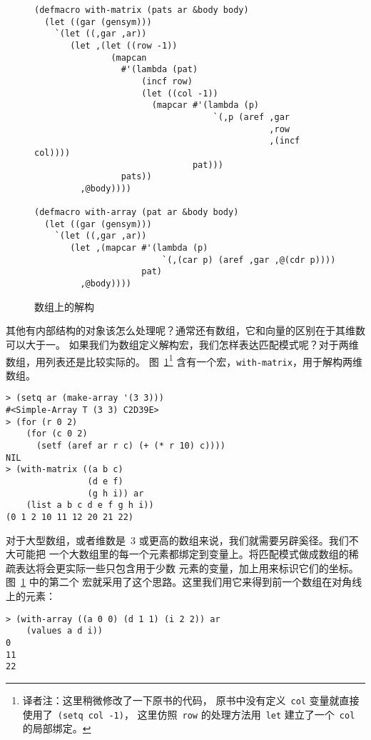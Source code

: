 \begin{figure}
\begin{lstlisting}
(defmacro with-matrix (pats ar &body body)
  (let ((gar (gensym)))
    `(let ((,gar ,ar))
       (let ,(let ((row -1))
               (mapcan
                 #'(lambda (pat)
                     (incf row)
                     (let ((col -1))
                       (mapcar #'(lambda (p)
                                   `(,p (aref ,gar
                                              ,row
                                              ,(incf col))))
                               pat)))
                 pats))
         ,@body))))

(defmacro with-array (pat ar &body body)
  (let ((gar (gensym)))
    `(let ((,gar ,ar))
       (let ,(mapcar #'(lambda (p)
                         `(,(car p) (aref ,gar ,@(cdr p))))
                     pat)
         ,@body))))
\end{lstlisting}
  \caption{数组上的解构}
  \label{fig:destructuring_on_arrays}
\end{figure}

其他有内部结构的对象该怎么处理呢？通常还有数组，它和向量的区别在于其维数可以大于一。
如果我们为数组定义解构宏，我们怎样表达匹配模式呢？对于两维数组，用列表还是比较实际的。
图~\ref{fig:destructuring_on_arrays}\footnote{译者注：这里稍微修改了一下原书的代码，
  原书中没有定义~\texttt{col} 变量就直接使用了~\texttt{(setq col -1)}，
  这里仿照~\texttt{row} 的处理方法用~\texttt{let} 建立了一个~\texttt{col}
  的局部绑定。} 含有一个宏，\texttt{with-matrix}，用于解构两维数组。
\begin{lstlisting}
> (setq ar (make-array '(3 3)))
#<Simple-Array T (3 3) C2D39E>
> (for (r 0 2)
    (for (c 0 2)
      (setf (aref ar r c) (+ (* r 10) c))))
NIL
> (with-matrix ((a b c)
                (d e f)
                (g h i)) ar
    (list a b c d e f g h i))
(0 1 2 10 11 12 20 21 22)
\end{lstlisting}

对于大型数组，或者维数是~3 或更高的数组来说，我们就需要另辟奚径。我们不大可能把
一个大数组里的每一个元素都绑定到变量上。将匹配模式做成数组的稀疏表达将会更实际一些\pozhehao{}只包含用于少数
元素的变量，加上用来标识它们的坐标。图~\ref{fig:destructuring_on_arrays} 中的第二个
宏就采用了这个思路。这里我们用它来得到前一个数组在对角线上的元素：
\begin{lstlisting}
> (with-array ((a 0 0) (d 1 1) (i 2 2)) ar
    (values a d i))
0
11
22
\end{lstlisting}

